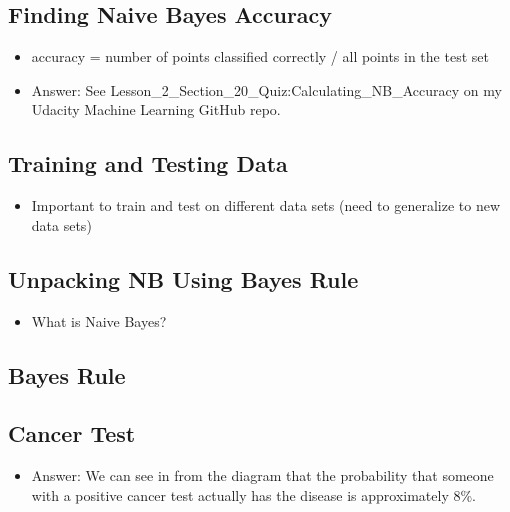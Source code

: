\documentclass[12pt]{report}
\begin{document}
\subsection{Finding Naive Bayes Accuracy}

\begin{itemize}

\item accuracy = number of points classified correctly / all points in the test set

\item Answer: See Lesson\_2\_Section\_20\_Quiz:Calculating\_NB\_Accuracy on my Udacity Machine Learning GitHub repo. 

\end{itemize}

\subsection{Training and Testing Data}

\begin{itemize}

\item Important to train and test on different data sets (need to generalize to new data sets)

\end{itemize}

\subsection{Unpacking NB Using Bayes Rule}

\begin{itemize}

\item What is Naive Bayes?

\end{itemize}

\subsection{Bayes Rule}

\subsection{Cancer Test}

\begin{itemize}

\item Answer: We can see in from the diagram that the probability that someone with a positive cancer test actually has the disease is approximately 8\%. 

\end{itemize}
\end{document}
